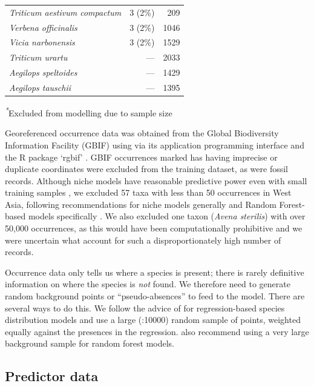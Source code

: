 \documentclass[
  authoryear,
  review]{elsarticle}
\begin{document}
\begin{table}
{\begin{tabular*}{\linewidth}{@{\extracolsep{\fill}}lrr}
\emph{Triticum aestivum compactum} & 3 (2\%) & 209 \\ 
\emph{Verbena officinalis} & 3 (2\%) & 1046 \\ 
\emph{Vicia narbonensis} & 3 (2\%) & 1529 \\ 
\emph{Triticum urartu} & — & 2033 \\ 
\emph{Aegilops speltoides} & — & 1429 \\ 
\emph{Aegilops tauschii} & — & 1395 \\ 
\bottomrule
\end{tabular*}
\begin{minipage}{\linewidth}
\textsuperscript{\textit{*}}Excluded from modelling due to sample size\\
\end{minipage}

}

\end{table}%

Georeferenced occurrence data was obtained from the Global Biodiversity
Information Facility (GBIF) using via its application programming
interface and the R package `rgbif'
\citep{ChamberlainBoettiger2017, rgbif}. GBIF occurrences marked has
having imprecise or duplicate coordinates were excluded from the
training dataset, as were fossil records. Although niche models have
reasonable predictive power even with small training samples
\citep{StockwellPeterson2002, HernandezEtAl2006, WiszEtAl2008}, we
excluded 57 taxa with less than 50 occurrences in West Asia, following
recommendations for niche models generally and Random Forest-based
models specifically \citep{StockwellPeterson2002, LuanEtAl2020}. We also
excluded one taxon (\emph{Avena sterilis}) with over 50,000 occurrences,
as this would have been computationally prohibitive and we were
uncertain what account for such a disproportionately high number of
records.

Occurrence data only tells us where a species is present; there is
rarely definitive information on where the species is \emph{not} found.
We therefore need to generate random background points or
``pseudo-absences'' to feed to the model. There are several ways to do
this. We follow the advice of \citet{BarbetMassinEtAl2012} for
regression-based species distribution models and use a large (:10000)
random sample of points, weighted equally against the presences in the
regression. \citet{ValaviEtAl2022} also recommend using a very large
background sample for random forest models.

\subsection{Predictor data}\label{predictor-data}
\end{document}

